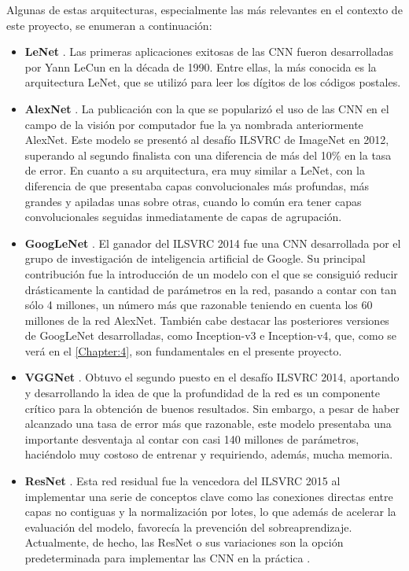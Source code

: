 Algunas de estas arquitecturas, especialmente las más relevantes en el contexto de este proyecto, se enumeran a continuación:
\begin{itemize}
  \item \textbf{LeNet} \cite{LeNet-5}. Las primeras aplicaciones exitosas de las CNN fueron desarrolladas por Yann LeCun en la década de 1990. Entre ellas, la más conocida es la arquitectura LeNet, que se utilizó para leer los dígitos de los códigos postales.
  \item \textbf{AlexNet} \cite{Krizhevsky}. La publicación con la que se popularizó el uso de las CNN en el campo de la visión por computador fue la ya nombrada anteriormente AlexNet. Este modelo se presentó al desafío ILSVRC de ImageNet en 2012, superando al segundo finalista con una diferencia de más del 10\% en la tasa de error. En cuanto a su arquitectura, era muy similar a LeNet, con la diferencia de que presentaba capas convolucionales más profundas, más grandes y apiladas unas sobre otras, cuando lo común era tener capas convolucionales seguidas inmediatamente de capas de agrupación.
  \item \textbf{GoogLeNet} \cite{GoogleNet}. El ganador del ILSVRC 2014 fue una CNN desarrollada por el grupo de investigación de inteligencia artificial de Google. Su principal contribución fue la introducción de un modelo con el que se consiguió reducir drásticamente la cantidad de parámetros en la red, pasando a contar con tan sólo 4 millones, un número más que razonable teniendo en cuenta los 60 millones de la red AlexNet. También cabe destacar las posteriores versiones de GoogLeNet desarrolladas, como Inception-v3 e Inception-v4, que, como se verá en el \autoref{Chapter:4}, son fundamentales en el presente proyecto.
  \item \textbf{VGGNet} \cite{VGGNet}. Obtuvo el segundo puesto en el desafío ILSVRC 2014, aportando y desarrollando la idea de que la profundidad de la red es un componente crítico para la obtención de buenos resultados. Sin embargo, a pesar de  haber alcanzado una tasa de error más que razonable, este modelo presentaba una importante desventaja al contar con casi 140 millones de parámetros, haciéndolo muy costoso de entrenar y requiriendo, además, mucha memoria.
  \item \textbf{ResNet} \cite{ResNet}. Esta red residual fue la vencedora del ILSVRC 2015 al implementar una serie de conceptos clave como las conexiones directas entre capas no contiguas y la normalización por lotes, lo que además de acelerar la evaluación del modelo, favorecía la prevención del sobreaprendizaje. Actualmente, de hecho, las ResNet o sus variaciones son la opción predeterminada para implementar las CNN en la práctica \cite{ImpactResNet}.
\end{itemize}

